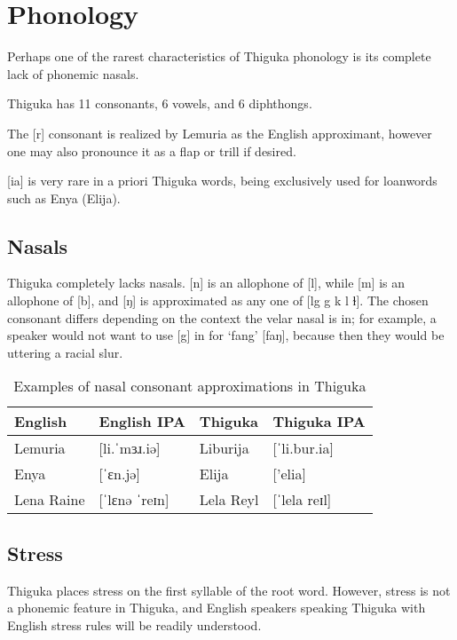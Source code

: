 \newpage

\section{Phonology}

Perhaps one of the rarest characteristics of Thiguka phonology is its complete lack of phonemic nasals.

Thiguka has 11 consonants, 6 vowels, and 6 diphthongs.



The [r] consonant is realized by Lemuria as the English approximant, however one may also pronounce it as a flap or trill if desired.


[ia] is very rare in a priori Thiguka words, being exclusively used for loanwords such as Enya (Elija).

\subsection{Nasals}

Thiguka completely lacks nasals. [n] is an allophone of [l], while [m] is an allophone of [b], and [ŋ] is approximated as any one of [lg g k l ɫ].
The chosen consonant differs depending on the context the velar nasal is in; for example, a speaker would not want to use [g] in for `fang' [faŋ], because then they would be uttering a racial slur.

\begin{table}[h!]
    \centering
    \caption{Examples of nasal consonant approximations in Thiguka}
    \begin{tabularx}{15cm}{|X|X|X|X|}
        \hline
        \textbf{English} & \textbf{English IPA} & \textbf{Thiguka} & \textbf{Thiguka IPA} \\
        \hline
        Lemuria    & [li.ˈmɜɹ.iə]   & Liburija  & [ˈli.bur.ia] \\
        Enya       & [ˈɛn.jə]       & Elija     & ['elia] \\
        Lena Raine & [ˈlɛnə ˈreɪn]  & Lela Reyl & [ˈlela reɪl] \\
        \hline
    \end{tabularx}
\end{table}

\subsection{Stress}
Thiguka places stress on the first syllable of the root word.
However, stress is not a phonemic feature in Thiguka, and English speakers speaking Thiguka with English stress rules will be readily understood.

